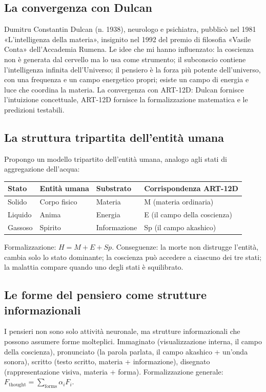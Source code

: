 \subsection{La convergenza con Dulcan}
Dumitru Constantin Dulcan (n. 1938), neurologo e psichiatra, pubblicò nel 1981 «L'intelligenza della materia», insignito nel 1992 del premio di filosofia «Vasile Conta» dell'Accademia Rumena. Le idee che mi hanno influenzato: la coscienza non è generata dal cervello ma lo usa come strumento; il subconscio contiene l'intelligenza infinita dell'Universo; il pensiero è la forza più potente dell'universo, con una frequenza e un campo energetico propri; esiste un campo di energia e luce che coordina la materia. La convergenza con ART-12D: Dulcan fornisce l'intuizione concettuale, ART-12D fornisce la formalizzazione matematica e le predizioni testabili.

\subsection{La struttura tripartita dell'entità umana}
Propongo un modello tripartito dell'entità umana, analogo agli stati di aggregazione dell'acqua:
\begin{table}[H]
\centering
\begin{tabular}{@{}llll@{}}
\toprule
\textbf{Stato} & \textbf{Entità umana} & \textbf{Substrato} & \textbf{Corrispondenza ART-12D} \\ \midrule
Solido & Corpo fisico & Materia & M (materia ordinaria) \\
Liquido & Anima & Energia & E (il campo della coscienza) \\
Gassoso & Spirito & Informazione & Sp (il campo akashico) \\ \bottomrule
\end{tabular}
\end{table}
Formalizzazione: $H = M + E + Sp$. Conseguenze: la morte non distrugge l'entità, cambia solo lo stato dominante; la coscienza può accedere a ciascuno dei tre stati; la malattia compare quando uno degli stati è squilibrato.

\subsection{Le forme del pensiero come strutture informazionali}
I pensieri non sono solo attività neuronale, ma strutture informazionali che possono assumere forme molteplici. Immaginato (visualizzazione interna, il campo della coscienza), pronunciato (la parola parlata, il campo akashico + un'onda sonora), scritto (testo scritto, materia + informazione), disegnato (rappresentazione visiva, materia + forma). Formalizzazione generale: $F_{\text{thought}} = \sum_{\text{forms}} \alpha_i F_i$.

